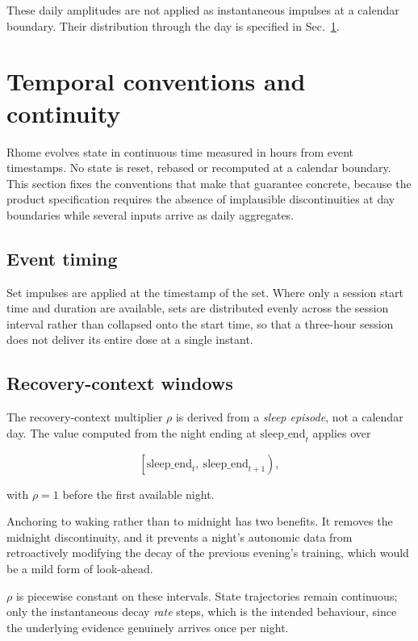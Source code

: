 \documentclass[11pt]{article}
\begin{document}
These daily amplitudes are not applied as instantaneous impulses at a calendar boundary. Their distribution through the day is specified in Sec.~\ref{sec:time}.

\section{Temporal conventions and continuity}
\label{sec:time}

Rhome evolves state in continuous time measured in hours from event timestamps. No state is reset, rebased or recomputed at a calendar boundary. This section fixes the conventions that make that guarantee concrete, because the product specification requires the absence of implausible discontinuities at day boundaries while several inputs arrive as daily aggregates.

\subsection{Event timing}

Set impulses are applied at the timestamp of the set. Where only a session start time and duration are available, sets are distributed evenly across the session interval rather than collapsed onto the start time, so that a three-hour session does not deliver its entire dose at a single instant.

\subsection{Recovery-context windows}

The recovery-context multiplier $\rho$ is derived from a \emph{sleep episode}, not a calendar day. The value computed from the night ending at $\mathrm{sleep\_end}_t$ applies over

\begin{equation}
\left[\mathrm{sleep\_end}_t,\ \mathrm{sleep\_end}_{t+1}\right),
\end{equation}

with $\rho=1$ before the first available night.

Anchoring to waking rather than to midnight has two benefits. It removes the midnight discontinuity, and it prevents a night's autonomic data from retroactively modifying the decay of the previous evening's training, which would be a mild form of look-ahead.

$\rho$ is piecewise constant on these intervals. State trajectories remain continuous; only the instantaneous decay \emph{rate} steps, which is the intended behaviour, since the underlying evidence genuinely arrives once per night.
\end{document}
